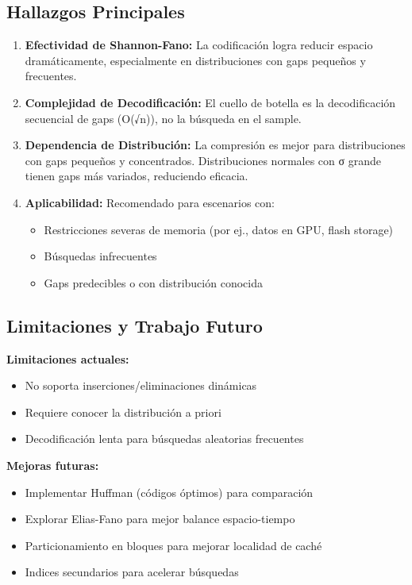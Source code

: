 \documentclass[11pt, twocolumn]{article}
\begin{document}
\subsection{Hallazgos Principales}

\begin{enumerate}
    \item \textbf{Efectividad de Shannon-Fano:} La codificación logra reducir espacio dramáticamente, especialmente en distribuciones con gaps pequeños y frecuentes.

    \item \textbf{Complejidad de Decodificación:} El cuello de botella es la decodificación secuencial de gaps (O(√n)), no la búsqueda en el sample.

    \item \textbf{Dependencia de Distribución:} La compresión es mejor para distribuciones con gaps pequeños y concentrados. Distribuciones normales con σ grande tienen gaps más variados, reduciendo eficacia.

    \item \textbf{Aplicabilidad:} Recomendado para escenarios con:
        \begin{itemize}
            \item Restricciones severas de memoria (por ej., datos en GPU, flash storage)
            \item Búsquedas infrecuentes
            \item Gaps predecibles o con distribución conocida
        \end{itemize}
\end{enumerate}

\subsection{Limitaciones y Trabajo Futuro}

\textbf{Limitaciones actuales:}
\begin{itemize}
    \item No soporta inserciones/eliminaciones dinámicas
    \item Requiere conocer la distribución a priori
    \item Decodificación lenta para búsquedas aleatorias frecuentes
\end{itemize}

\textbf{Mejoras futuras:}
\begin{itemize}
    \item Implementar Huffman (códigos óptimos) para comparación
    \item Explorar Elias-Fano para mejor balance espacio-tiempo
    \item Particionamiento en bloques para mejorar localidad de caché
    \item Indices secundarios para acelerar búsquedas
\end{itemize}
\end{document}
